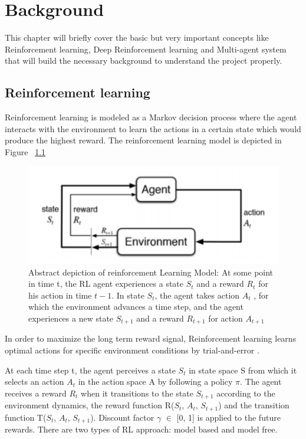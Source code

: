 \documentclass[12pt]{report}
\begin{document}
\chapter{Background}                       

This chapter will briefly cover the basic but very important concepts like Reinforcement learning, Deep Reinforcement learning and Multi-agent system that will build the necessary background to understand the project properly.  

\section{Reinforcement learning}

Reinforcement learning is modeled as a Markov decision process where the agent interacts with the environment to learn the actions in a certain state which would produce the highest reward. The reinforcement learning model is depicted in Figure ~\ref{fig:ReinforcementLearningModel} 

\begin{figure}[!h]
    \centering
    \includegraphics[width=12cm]{ReinforcementLearningModel.png}
    \caption{Abstract depiction of reinforcement Learning Model: At some point in time t, the RL agent experiences a state $S_t$ and a reward $R_t$ for his action in time $t-1$. In state $S_t$, the agent takes action $A_t$ , for which the environment advances a time step, and the agent experiences a new state $S_{t+1}$ and a reward $R_{t+1}$ for action $A_{t+1}$}
    \label{fig:ReinforcementLearningModel}
\end{figure}

In order to maximize the long term reward signal, Reinforcement learning learns optimal actions for specific environment conditions by trial-and-error \cite{Barto}. 

At each time step t, the agent perceives a state $S_t$ in state space S from which it selects an action $A_t$ in the action space A by following a policy $\pi$. The agent receives a reward $R_t$ when it transitions to the state $S_{t+1}$ according to the environment dynamics, the reward function R($S_t$, $A_t$, $S_{t+1}$) and the transition function T($S_t$, $A_t$, $S_{t+1}$). Discount factor $\gamma$ $\in$ [0, 1] is applied to the future rewards. There are two types of RL approach: model based and model free. 
\end{document}
